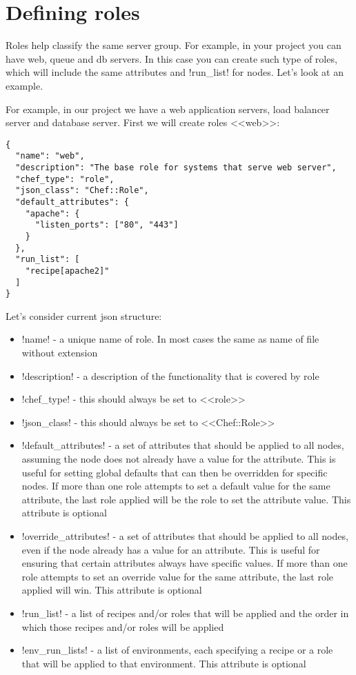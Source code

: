 \section{Defining roles}
\label{sec:solo-role}

Roles help classify the same server group. For example, in your project you can have web, queue and db servers. In this case you can create such type of roles, which will include the same attributes and \inline!run_list! for nodes. Let's look at an example.

For example, in our project we have a web application servers, load balancer server and database server. First we will create roles <<web>>:

\begin{lstlisting}[label=lst:my-cloud-role1,title=my-cloud/roles/web.json]
{
  "name": "web",
  "description": "The base role for systems that serve web server",
  "chef_type": "role",
  "json_class": "Chef::Role",
  "default_attributes": {
    "apache": {
      "listen_ports": ["80", "443"]
    }
  },
  "run_list": [
    "recipe[apache2]"
  ]
}
\end{lstlisting}

Let's consider current json structure:

\begin{itemize}
  \item \inline!name! - a unique name of role. In most cases the same as name of file without extension
  \item \inline!description! - a description of the functionality that is covered by role
  \item \inline!chef_type! - this should always be set to <<role>>
  \item \inline!json_class! - this should always be set to <<Chef::Role>>
  \item \inline!default_attributes! - a set of attributes that should be applied to all nodes, assuming the node does not already have a value for the attribute. This is useful for setting global defaults that can then be overridden for specific nodes. If more than one role attempts to set a default value for the same attribute, the last role applied will be the role to set the attribute value. This attribute is optional
  \item \inline!override_attributes! - a set of attributes that should be applied to all nodes, even if the node already has a value for an attribute. This is useful for ensuring that certain attributes always have specific values. If more than one role attempts to set an override value for the same attribute, the last role applied will win. This attribute is optional
  \item \inline!run_list! - a list of recipes and/or roles that will be applied and the order in which those recipes and/or roles will be applied
  \item \inline!env_run_lists! - a list of environments, each specifying a recipe or a role that will be applied to that environment. This attribute is optional
\end{itemize}

